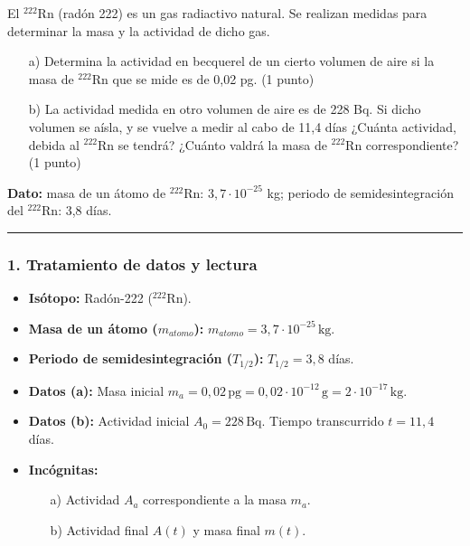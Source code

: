 \begin{cajaenunciado}
El ${}^{222}\text{Rn}$ (radón 222) es un gas radiactivo natural. Se realizan medidas para determinar la masa y la actividad de dicho gas.
\begin{enumerate}
    \item[a)] Determina la actividad en becquerel de un cierto volumen de aire si la masa de ${}^{222}\text{Rn}$ que se mide es de 0,02 pg. (1 punto)
    \item[b)] La actividad medida en otro volumen de aire es de 228 Bq. Si dicho volumen se aísla, y se vuelve a medir al cabo de 11,4 días ¿Cuánta actividad, debida al ${}^{222}\text{Rn}$ se tendrá? ¿Cuánto valdrá la masa de ${}^{222}\text{Rn}$ correspondiente? (1 punto)
\end{enumerate}
\textbf{Dato:} masa de un átomo de ${}^{222}\text{Rn}$: $3,7\cdot10^{-25}$ kg; periodo de semidesintegración del ${}^{222}\text{Rn}$: 3,8 días.
\end{cajaenunciado}
\hrule

\subsubsection*{1. Tratamiento de datos y lectura}
\begin{itemize}
    \item \textbf{Isótopo:} Radón-222 (${}^{222}\text{Rn}$).
    \item \textbf{Masa de un átomo ($m_{atomo}$):} $m_{atomo} = 3,7 \cdot 10^{-25} \, \text{kg}$.
    \item \textbf{Periodo de semidesintegración ($T_{1/2}$):} $T_{1/2} = 3,8$ días.
    \item \textbf{Datos (a):} Masa inicial $m_a = 0,02 \, \text{pg} = 0,02 \cdot 10^{-12} \, \text{g} = 2 \cdot 10^{-17} \, \text{kg}$.
    \item \textbf{Datos (b):} Actividad inicial $A_0 = 228 \, \text{Bq}$. Tiempo transcurrido $t = 11,4$ días.
    \item \textbf{Incógnitas:}
    \begin{itemize}
        \item[a)] Actividad $A_a$ correspondiente a la masa $m_a$.
        \item[b)] Actividad final $A(t)$ y masa final $m(t)$.
    \end{itemize}
\end{itemize}


